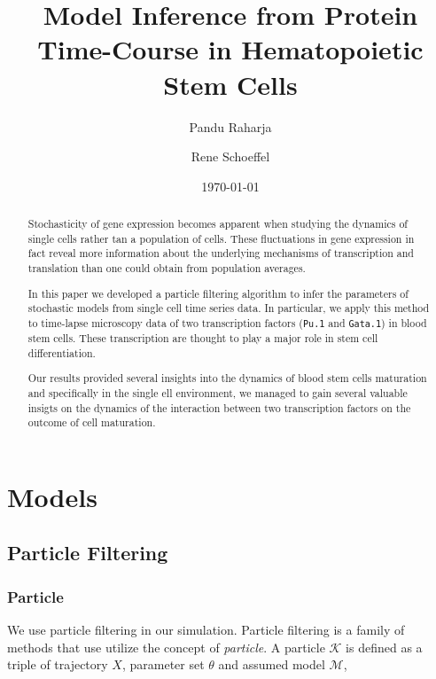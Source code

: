 \documentclass[12pt, oneside]{article}
\begin{document}
\title{Model Inference from Protein Time-Course in Hematopoietic Stem Cells}

\date{\today}

\author{Pandu Raharja \and Rene Schoeffel}

\maketitle

\begin{abstract}
Stochasticity of gene expression becomes apparent when studying the dynamics of single cells rather tan a population of cells. These fluctuations in gene expression in fact reveal more information about the underlying mechanisms of transcription and translation than one could obtain from population averages.

In this paper we developed a particle filtering algorithm to infer the parameters of stochastic models from single cell time series data. In particular, we apply this method to time-lapse microscopy data of two transcription factors (\texttt{Pu.1} and \texttt{Gata.1}) in blood stem cells. These transcription are thought to play a major role in stem cell differentiation.

Our results provided several insights into the dynamics of blood stem cells maturation and specifically in the single ell environment, we managed to gain several valuable insigts on the dynamics of the interaction between two transcription factors on the outcome of cell maturation.
\end{abstract}

\section{Models}

\subsection{Particle Filtering}

\subsubsection{Particle}

We use particle filtering in our simulation. Particle filtering is a family of methods that use utilize the concept of \textit{particle}. A particle $\mathcal{K}$ is defined as a triple of trajectory $X$, parameter set $\theta$ and assumed model $\mathcal{M}$,
\end{document}

